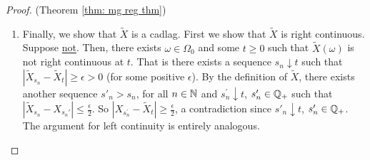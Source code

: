 \documentclass{article}
\begin{document}
\begin{proof}{(Theorem \ref{thm: mg reg thm})}
\begin{enumerate}
	\underline{Claim:} $ \mathbb{E}\left[ X_{t}|\F_{t^{+}} \right] = \tilde{X}_{s}$ a.s. Indeed, first observe that for $ Y$ any random variable and $ \mathcal{G}$ a sigma algebra it follows that
	\[
	\mathbb{E}\left[ Y| \sigma \mathcal{G}, \mathcal{N}) \right] = \mathbb{E}\left[ X | \mathcal{G} \right]
	\]
	which is clear because the conditional expectation is defined almost surely and $ \mathcal{N}$ only contains sets of measure zero.\\ 

Now, fix $ s<t$ and let  $ s_{n}\downarrow s$, $ s_{n}\in \Q_{+}$, $ s_{0}<t$. We have by the  tower property that $ (\mathbb{E}\left[ X_{t}|\F_{s_{n}} \right])_{n\in \N}$ is a backwards martingale and so it converges a.s. and in $ \mathcal{L}^{1} $ to $ \mathbb{E}\left[ X_{t}|\F_{t^{+}} \right]$. But $ \mathbb{E}\left[ X_{t}|\F_{s_{n}} \right] = X_{s_{n}}$ a.s. and $ X_{s_{s}}\to \tilde{X}_{s}$ a.s. as $ n'to \infty$. So $ \tilde{X}_{s} = \mathbb{E}\left[ X_{t}|\F_{s^{+}} \right]$.
	
\item Finally, we show that $\tilde{X}$ is a cadlag. First we show that $ \tilde{X}
	$ is right continuous. Suppose \underline{not}. Then, there exists $ \omega \in \Omega_{0}$ and some $ t\geq 0$ such that $ \tilde{X}(\omega)$ is not right continuous at $ t$. That is there exists a sequence $ s_{n}\downarrow t$ such that $ |\tilde{X}_{s_{n}}-\tilde{X}_{t}|\geq \epsilon >0$ (for some positive $ \epsilon$). By the definition of $ \tilde{X}$, there exists another sequence $ s'_{n}>s_{n}$, for all $ n\in \mathbb{N}$ and $ s^{'}_{n}\downarrow t$, $ s'_{n}\in \mathbb{Q}_{+}$ such that $ |\tilde{X}_{s_{n}}-X_{s_{n}'}|\leq \frac{\epsilon}{2}$. So $ |X_{s^{'}_{n}}-\tilde{X}_{t}|\geq \frac{\epsilon}{2}$, a contradiction since $ s'_{n}\downarrow t$, $ s'_{n}\in \mathbb{Q}_{+}$. The argument for left continuity is entirely analogous. 
	
   \end{enumerate}
    
\end{proof}
\end{document}
